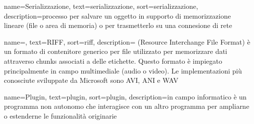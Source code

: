 {
	name=Serializzazione,
	text=serializzazione,
	sort=serializzazione,
	description={processo per salvare un oggetto in supporto di memorizzazione lineare (file o area di memoria) o per trasmetterlo su una connesione di rete}
}

{
	name=,
	text=RIFF,
	sort=riff,
	description={ (Resource Interchange File Format) è un formato di contenitore generico per file utilizzato per memorizzare dati attraverso chunks associati a delle etichette. Questo formato è impiegato principalmente in campo multimediale (audio o video). Le implementazioni più conosciute sviluppate da Microsoft sono AVI, ANI e WAV}
}

{
	name=Plugin,
	text=plugin,
	sort=plugin,
	description={in campo informatico è un programma non autonomo che interagisce con un altro programma per ampliarne o estenderne le funzionalità originarie}
}

